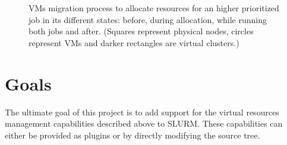 \documentclass[10pt,authoryear]{sigplanconf} %
\begin{document}
\begin{figure}[h]
\begin{center}
		\hfill
	\end{center}
	\caption{VMs migration process to allocate resources for an higher prioritized job in its different states: before, during allocation, while running both jobs and after. (Squares represent physical nodes, circles represent VMs and darker rectangles are virtual clusters.)}
	\label{fig:migration-process}
\end{figure}


\section{Goals}

The ultimate goal of this project is to add support for the virtual resources management capabilities described above to SLURM. These capabilities can either be provided as plugins or by directly modifying the source tree.
\end{document}
